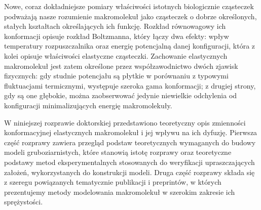 Nowe, coraz dokładniejsze pomiary właściwości istotnych biologicznie cząsteczek podważają nasze rozumienie makromolekuł jako cząsteczek o dobrze określonych, stałych kształtach określających ich funkcję.
Rozkład równowagowy ich konformacji opisuje rozkład Boltzmanna, który łączy dwa efekty: wpływ temperatury rozpuszczalnika oraz energię potencjalną danej konfiguracji, która z kolei opisuje właściwości elastyczne cząsteczki.
Zachowanie elastycznych makromolekuł jest zatem określone przez współzawodnictwo dwóch zjawisk fizycznych: gdy studnie potencjału są płytkie w porównaniu z typowymi fluktuacjami termicznymi, występuje szeroka gama konformacji; z drugiej strony, gdy są one głębokie, można zaobserwować jedynie niewielkie odchylenia od konfiguracji minimalizujących energię makromolekuły.

W niniejszej rozprawie doktorskiej przedstawiono teoretyczny opis zmienności konformacyjnej elastycznych makromolekuł i jej wpływu na ich dyfuzję.
Pierwsza część rozprawy zawiera przegląd podstaw teoretycznych wymaganych do budowy modeli gruboziarnistych, które stanowią istotę rozprawy oraz teoretyczne podstawy metod eksperymentalnych stosowanych do weryfikacji upraszczających założeń, wykorzystanych do konstrukcji modeli.
Druga część rozprawy składa się z szeregu powiązanych tematycznie publikacji i preprintów, w których prezentujemy metody modelowania makromolekuł w szerokim zakresie ich sprężystości.

